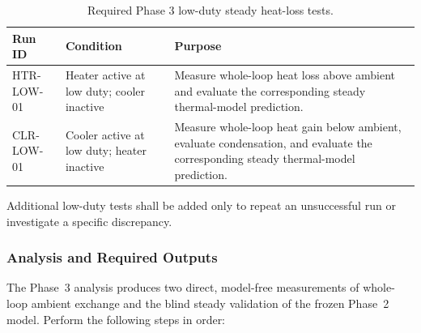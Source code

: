 \documentclass[11pt]{article}
\begin{document}
\begin{table}[htbp]
    \centering
    \caption{Required Phase 3 low-duty steady heat-loss tests.}
    \label{tab:phase3_runs}
    \begin{tabularx}{\textwidth}{
        @{}
        >{\raggedright\arraybackslash}p{1.25in}
        >{\raggedright\arraybackslash}p{1.75in}
        >{\raggedright\arraybackslash}X
        @{}
    }
        \toprule
        \textbf{Run ID} &
        \textbf{Condition} &
        \textbf{Purpose} \\
        \midrule

        HTR-LOW-01 &
        Heater active at low duty; cooler inactive &
        Measure whole-loop heat loss above ambient and evaluate the corresponding steady thermal-model prediction. \\

        CLR-LOW-01 &
        Cooler active at low duty; heater inactive &
        Measure whole-loop heat gain below ambient, evaluate condensation, and evaluate the corresponding steady thermal-model prediction. \\

        \bottomrule
    \end{tabularx}
\end{table}

Additional low-duty tests shall be added only to repeat an unsuccessful run or investigate a specific discrepancy.

\subsubsection{Analysis and Required Outputs}

The Phase~3 analysis produces two direct, model-free measurements of whole-loop ambient exchange and the blind steady validation of the frozen Phase~2 model. Perform the following steps in order:
\end{document}
